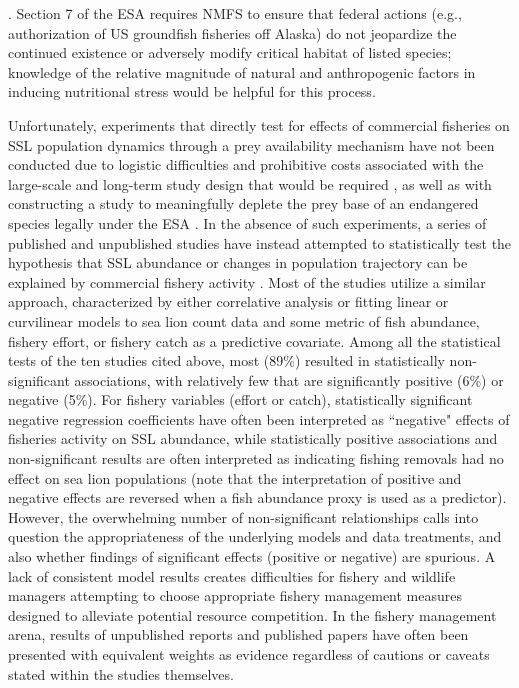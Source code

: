 \documentclass[nonumbib,leqno]{nrc1}
\begin{document}
\citep{NMFS2003,NMFS2008}.   Section 7 of the ESA requires NMFS to ensure that federal actions (e.g., authorization of US groundfish fisheries off Alaska) do not jeopardize the continued existence or adversely modify critical habitat of listed species; knowledge of the relative magnitude of natural and anthropogenic factors in inducing nutritional stress would be helpful for this process.

Unfortunately, experiments that directly test for effects of commercial fisheries on SSL population dynamics through a prey availability mechanism have not been conducted due to logistic difficulties and prohibitive costs associated with the large-scale and long-term study design that would be required \citep{FerreroFritz2002}, as well as with constructing a study to meaningfully deplete the prey base of an endangered species legally under the ESA \citep{Bryant2009}. In the absence of such experiments, a series of published and unpublished studies have instead attempted to statistically test the hypothesis that SSL abundance or changes in population trajectory can be explained by commercial fishery activity \citep{Loughlin:1989kl,Ferrero:1994hc,Sampson:1995cr,Dillingham:2006fv,Hennen:2006bs,Soboleff:2006fk,Calkins:2008ve,afsc:2010dz,
Trites:2010ly,Hui:2011uq}. Most of the studies utilize a similar approach, characterized by either correlative analysis or fitting linear or curvilinear models to sea lion count data and some metric of fish abundance, fishery effort, or fishery catch as a predictive covariate. Among all the statistical tests of the ten studies cited above, most (89\%) resulted in statistically non-significant associations, with relatively few that are significantly positive (6\%) or negative (5\%). For fishery variables (effort or catch), statistically significant negative regression coefficients have often been interpreted as ``negative" effects of fisheries activity on SSL abundance, while statistically positive associations and non-significant results are often interpreted as indicating fishing removals had no effect on sea lion populations (note that the interpretation of positive and negative effects are reversed when a fish abundance proxy is used as a predictor). However, the overwhelming number of non-significant relationships calls into question the appropriateness of the underlying models and data treatments, and also whether findings of significant effects (positive or negative) are spurious. A lack of consistent model results creates difficulties for fishery and wildlife managers attempting to choose appropriate fishery management measures designed to alleviate potential resource competition. In the fishery management arena, results of unpublished reports and published papers have often been presented with equivalent weights as evidence \citep[e.g., see][]{Bernard:2011dq} regardless of cautions or caveats stated within the studies themselves.
\end{document}

